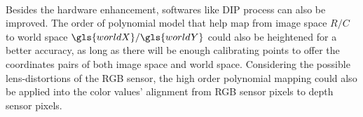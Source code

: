 \\\indent
Besides the hardware enhancement, softwares like \gls{DIP} process can also be improved. The order of polynomial model that help map from image space \(R/C\) to world space \(\gls{worldX}/\gls{worldY}\) could also be heightened for a better accuracy, as long as there will be enough calibrating points to offer the coordinates pairs of both image space and world space. Considering the possible lens-distortions of the RGB sensor, the high order polynomial mapping could also be applied into the color values' alignment from RGB sensor pixels to depth sensor pixels.
































